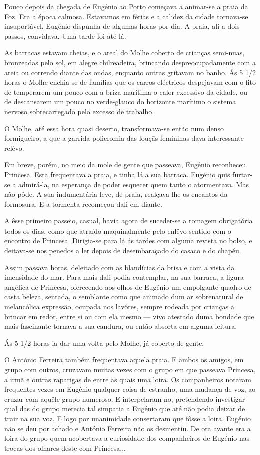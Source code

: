 \documentclass[9pt]{article}
\begin{document}
Pouco depois da chegada de Eugé\-nio ao Porto começava a ani\-\mbox{mar-se} a
praia da Foz. Era a época calmosa. Estavamos em férias e a calidez da cidade
tornava-se insuportável. Eugé\-nio dispunha de algumas horas por dia. A praia,
ali a dois passos, convidava. Uma tarde foi até lá.

\fotoB

As barracas estavam cheias, e o areal do Mo\-lhe coberto de crian\-ças
semi-nuas, bronzeadas pelo sol, em alegre chilreadeira, brincando despreocupadamente com a areia ou correndo diante das ondas, enquanto outras gritavam
no banho. Ás 5 1/2 horas o Mo\-lhe enchia-se de fa\-mí\-lias que os carros eléctricos despejavam com o fito de temperarem um pouco com a briza marítima
o calor excessivo da cidade, ou de descansarem um pouco no verde-glauco do
horizonte marítimo o sistema nervoso sobrecarregado pelo excesso de traba\-lho.

O Mo\-lhe, até essa hora quasi deserto, transformava-se então num denso
formigueiro, a que a garrida policromia das louçãs femininas dava interessante relêvo.

Em breve, porém, no meio da mole de gente que passeava, Eugé\-nio reconheceu Princesa. Esta frequentava a praia, e tinha lá a sua barraca. Eugé\-nio
quis furtar-se a admirá-la, na esperan\-ça de poder esque\-cer quem tanto o atormentava. Mas não pôde. A sua indumentária leve, de praia, realçava-\-lhe os
encantos da formosura. E a tormenta recomeçou dali em diante.

A êsse primeiro passeio, casual, havia agora de suceder-se a romagem
obrigatória todos os dias, como que atraído maquinalmente pelo enlêvo sentido
com o encontro de Princesa. Dirigia-se para lá ás tardes com alguma revista no bolso, e deitava-se nos penedos a ler depois de desembaraçado do casaco e do chapéu.

Assim passava horas, deleitado com as blandícias da brisa e com a vista da imensidade do mar. Para mais dali podia contemplar, na sua barraca, a
figura angélica de Princesa, oferecendo aos o\-lhos de Eugé\-nio um empolgante
quadro de casta beleza, sentada, o semblante como que animado dum ar sobrenatural de melancólica ex\-pres\-são, ocupada nos lavôres, sempre rodeada por
crian\-ças a brincar em redor, entre si ou com ela mesmo — vivo atestado duma
bondade que mais fascinante tornava a sua candura, ou então absorta em alguma leitura.

Ás 5 1/2 horas ia dar uma volta pelo Mo\-lhe, já coberto de gente.

O António Ferreira também frequentava aquela praia. E ambos os amigos,
em grupo com outros, cruzavam muitas vezes com o grupo em que passeava Princesa, a irmã e outras raparigas de entre as quais uma loira. Os companheiros notaram frequentes vezes em Eugé\-nio qualquer coisa de estranho, uma
mudan\-ça de voz, ao cruzar com a\-quê\-le grupo numeroso. E interpelaram-no, pretendendo investigar qual das do grupo merecia tal simpatia a Eugé\-nio que
até não podia deixar de trair na sua voz. E logo por unanimidade consertaram que fôsse a loira. Eugé\-nio não se deu por achado e António Ferreira
não os desmentiu. De ora avante era a loira do grupo quem acobertava a curiosidade dos companheiros de Eugé\-nio nas trocas dos o\-lhares deste com
Princesa...
\end{document}
